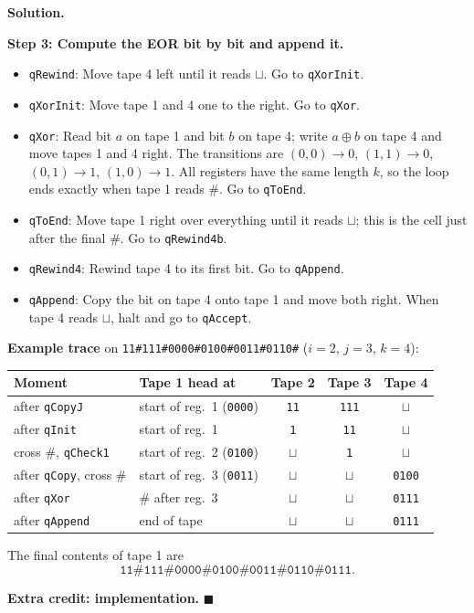 \documentclass[11pt]{article}
\newenvironment{solution}{%
  \par\noindent\textbf{Solution.}\ \normalfont
}{\hfill$\blacksquare$\par\medskip}
\theoremstyle{plain}
\theoremstyle{definition}
\newcommand{\blank}{\sqcup}                    %
\begin{document}
\begin{solution}
\textbf{Step 3: Compute the EOR bit by bit and append it.}
\begin{itemize}
  \item \texttt{qRewind}: Move tape 4 left until it reads $\blank$. Go to \texttt{qXorInit}.
  \item \texttt{qXorInit}: Move tape 1 and 4 one to the right. Go to \texttt{qXor}.
  \item \texttt{qXor}: Read bit $a$ on tape 1 and bit $b$ on tape 4; write $a \oplus b$ on tape 4 and move tapes 1 and 4 right. The transitions are $(0,0) \to 0$, $(1,1) \to 0$, $(0,1) \to 1$, $(1,0) \to 1$. All registers have the same length $k$, so the loop ends exactly when tape 1 reads $\#$. Go to \texttt{qToEnd}.
  \item \texttt{qToEnd}: Move tape 1 right over everything until it reads $\blank$; this is the cell just after the final $\#$. Go to \texttt{qRewind4b}.
  \item \texttt{qRewind4}: Rewind tape 4 to its first bit. Go to \texttt{qAppend}.
  \item \texttt{qAppend}: Copy the bit on tape 4 onto tape 1 and move both right. When tape 4 reads $\blank$, halt and go to \texttt{qAccept}.
\end{itemize}

\textbf{Example trace} on \texttt{11\#111\#0000\#0100\#0011\#0110\#} ($i = 2$, $j = 3$, $k = 4$):

\begin{center}
\begin{tabular}{@{}llccc@{}}
\toprule
Moment & Tape 1 head at & Tape 2 & Tape 3 & Tape 4 \\
\midrule
after \texttt{qCopyJ}        & start of reg.\ 1 (\texttt{0000}) & \texttt{11} & \texttt{111} & $\blank$ \\
after \texttt{qInit}         & start of reg.\ 1                 & \texttt{1}  & \texttt{11}  & $\blank$ \\
cross \#, \texttt{qCheck1}   & start of reg.\ 2 (\texttt{0100}) & $\blank$    & \texttt{1}   & $\blank$ \\
after \texttt{qCopy}, cross \# & start of reg.\ 3 (\texttt{0011}) & $\blank$  & $\blank$     & \texttt{0100} \\
after \texttt{qXor}          & \# after reg.\ 3                 & $\blank$    & $\blank$     & \texttt{0111} \\
after \texttt{qAppend}       & end of tape                      & $\blank$    & $\blank$     & \texttt{0111} \\
\bottomrule
\end{tabular}
\end{center}

\noindent The final contents of tape 1 are
\[
  \texttt{11\#111\#0000\#0100\#0011\#0110\#0111}.
\]

\bigskip
\textbf{Extra credit: implementation.}
\end{solution}
\end{document}
